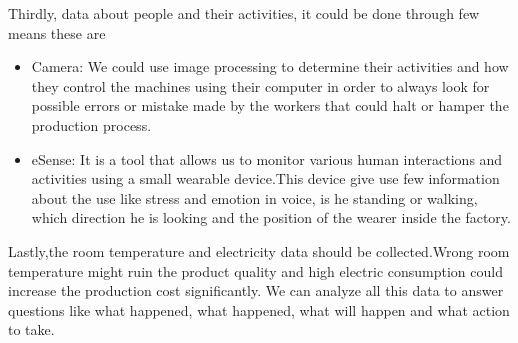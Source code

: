 \documentclass{article}
\begin{document}
\begin{normalsize}
      Thirdly, data about people and their activities, it could be done through few means these are 
       	\begin{itemize}
        
\item{Camera: We could use image processing to determine their activities and how they control the machines using their computer in order to always look for possible errors or mistake made by the workers that could halt or hamper the production process. }
\item{eSense: It is a tool that allows us to monitor various human interactions and activities using a small wearable device.This device give use few information about the use like stress and emotion in voice, is he standing or walking, which direction he is looking and the position of the wearer inside the factory.
} 

	


	\end{itemize}
	Lastly,the room temperature and electricity data should be collected.Wrong room temperature might ruin the product quality and 
high electric consumption could increase the production cost significantly.
	We can analyze all this data to answer questions like what happened, what happened, what will happen and what action to take.
\end{normalsize}
  
\end{document}
